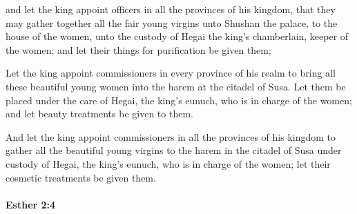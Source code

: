 			\begin{versebox}
					\item[BHS] 
					\item[LXX] 
					\item[ASV] and let the king appoint officers in all the provinces of his kingdom, that they may gather together all the fair young virgins unto Shushan the palace, to the house of the women, unto the custody of Hegai the king's chamberlain, keeper of the women; and let their things for purification be given them;
					\item[NIV] Let the king appoint commissioners in every province of his realm to bring all these beautiful young women into the harem at the citadel of Susa. Let them be placed under the care of Hegai, the king’s eunuch, who is in charge of the women; and let beauty treatments be given to them.
					\item[NRSV] And let the king appoint commissioners in all the provinces of his kingdom to gather all the beautiful young virgins to the harem in the citadel of Susa under custody of Hegai, the king’s eunuch, who is in charge of the women; let their cosmetic treatments be given them.
			\end{versebox}

		\paragraph{Esther 2:4} %
			\label{ESTHER-2-4}


